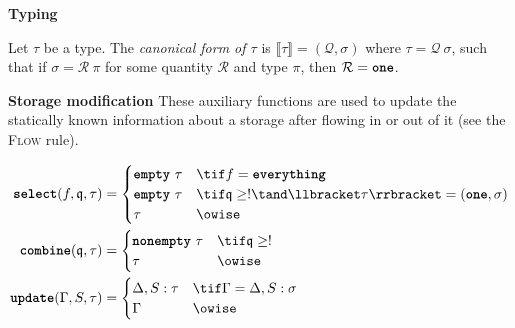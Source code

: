 \documentclass[10pt]{article}
\begin{document}
 \textbf{Typing}
\begin{mathpar}



\end{mathpar}

\begin{definition}
    Let $\tau$ be a type.
    The \emph{canonical form of $\tau$} is $\llbracket \tau \rrbracket = (\mathcal{Q}, \sigma)$ where $\tau = \mathcal{Q}~\sigma$, such that if $\sigma = \mathcal{R}~\pi$ for some quantity $\mathcal{R}$ and type $\pi$, then $\mathcal{R} = \one$.
\end{definition}

 \textbf{Storage modification}
These auxiliary functions are used to update the statically known information about a storage after flowing in or out of it (see the \textsc{Flow} rule).

\begin{align*}
    \select(f, \mathfrak{q}, \tau) &=
    \begin{cases}
        \emptyq~\tau & \tif f = \everything \\
        \emptyq~\tau & \tif \mathfrak{q} \geq ! \tand \llbracket \tau \rrbracket = (\one, \sigma) \\
        \tau & \owise
    \end{cases}
    \\
    \combine(\mathfrak{q}, \tau) &=
    \begin{cases}
        \nonempty~\tau & \tif \mathfrak{q} \geq ! \\
        \tau & \owise
    \end{cases} \\
    \update(\Gamma, S, \tau) &=
    \begin{cases}
        \Delta, S : \tau & \tif \Gamma = \Delta, S : \sigma \\
        \Gamma & \owise
    \end{cases}
\end{align*}
\end{document}
